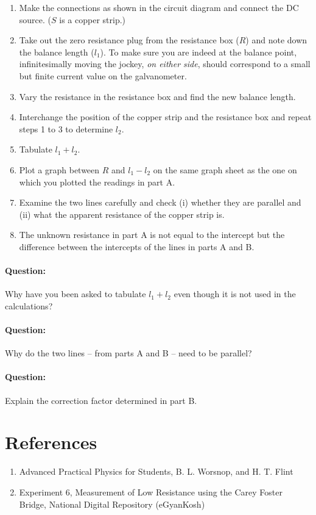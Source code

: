 \begin{enumerate}
    \item Make the connections as shown in the circuit diagram and connect the DC source. ($S$ is a copper strip.)
    \item Take out the zero resistance plug from the resistance box ($R$) and note down the balance length ($l_1$). To make sure you are indeed at the balance point, infinitesimally moving the jockey, \textit{on either side}, should correspond to a small but finite current value on the galvanometer.
    \item Vary the resistance in the resistance box and find the new balance length.
    \item Interchange the position of the copper strip and the resistance box and repeat steps 1 to 3 to determine $l_2$.
    \item Tabulate $l_1 + l_2$.
    \item Plot a graph between $R$ and $l_1 -l_2$ on the same graph sheet as the one on which you plotted the readings in part A. 
    \item Examine the two lines carefully and check (i) whether they are parallel and (ii) what the apparent resistance of the copper strip is. 
    \item The unknown resistance in part A is not equal to the intercept but the difference between the intercepts of the lines in parts A and B. 
    
\end{enumerate}

\begin{question}
\paragraph{Question:} Why have you been asked to tabulate $l_1 + l_2$ even though it is not used in the calculations?~\\
\paragraph{Question:} Why do the two lines -- from parts A and B -- need to be parallel?~\\
\paragraph{Question:} Explain the correction factor determined in part B. 
\end{question}

\section*{References}

\begin{enumerate}
\item Advanced Practical Physics for Students, B. L. Worsnop, and H. T. Flint
\item Experiment 6, Measurement of Low Resistance using the Carey Foster Bridge, National Digital Repository (eGyanKosh)
\end{enumerate}


\newpage